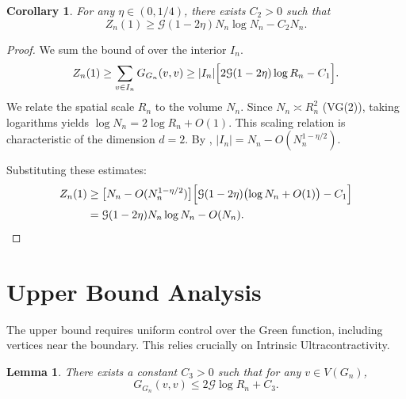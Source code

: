 \documentclass{article}
\numberwithin{equation}{section}
\newtheorem{lemma}[theorem]{Lemma}
\newtheorem{corollary}[theorem]{Corollary}
\theoremstyle{definition}
\theoremstyle{remark}
\newcommand{\cG}{\mathcal{G}}
\begin{document}
\begin{corollary}\label{cor:lower}
For any $\eta \in (0,1/4)$, there exists $C_2 > 0$ such that
\[
Z_n(1) \geq \cG(1-2\eta) N_n \log N_n - C_2 N_n.
\]
\end{corollary}

\begin{proof}
We sum the bound of  over the interior $I_n$.
\[
Z_n(1) \geq \sum_{v \in I_n} G_{G_n}(v,v) \geq |I_n|\Bigl[2\cG(1-2\eta)\log R_n - C_1\Bigr].
\]
We relate the spatial scale $R_n$ to the volume $N_n$. Since $N_n \asymp R_n^2$ (VG(2)), taking logarithms yields $\log N_n = 2\log R_n + O(1)$. This scaling relation is characteristic of the dimension $d=2$. By , $|I_n| = N_n - O(N_n^{1-\eta/2})$.

Substituting these estimates:
\begin{align*}
Z_n(1) &\geq \bigl[N_n - O(N_n^{1-\eta/2})\bigr]
         \Bigl[\cG(1-2\eta)\bigl(\log N_n + O(1)\bigr) - C_1\Bigr] \\
&= \cG(1-2\eta) N_n \log N_n - O(N_n).\qedhere
\end{align*}
\end{proof}

\section{Upper Bound Analysis}\label{sec:upper_bound}

The upper bound requires uniform control over the Green function, including vertices near the boundary. This relies crucially on Intrinsic Ultracontractivity.

\begin{lemma}\label{lem:upper}
There exists a constant $C_3 > 0$ such that for any $v \in V(G_n)$,
\[
G_{G_n}(v,v) \leq 2\cG \log R_n + C_3.
\]
\end{lemma}
\end{document}
